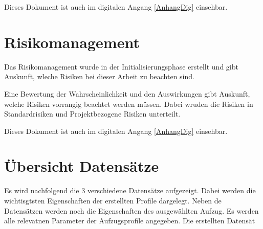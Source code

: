 Dieses Dokument ist auch im digitalen Angang \ref{AnhangDig} einsehbar.


%

%



\chapter{Risikomanagement}
\label{AnhangC}
\setcounter{page}{9}
Das Risikomanagement wurde in der Initialisierungsphase erstellt und gibt Auskunft, wleche Risiken bei dieser Arbeit zu beachten sind.

Eine Bewertung der Wahrscheinlichkeit und den Auswirkungen gibt Auskunft, welche Risiken vorrangig beachtet werden müssen.  Dabei wruden die Risiken in Standardrisiken und Projektbezogene Risiken unterteilt.

Dieses Dokument ist auch im digitalen Angang \ref{AnhangDig} einsehbar.


\chapter{Übersicht Datensätze }
\label{AnhangD}

Es wird nachfolgend die 3 verschiedene Datensätze aufgezeigt. Dabei werden die wichtisgtsten Eigenschaften der erstellten Profile dargelegt. Neben de Datensätzen werden noch die Eigenschaften des ausgewählten Aufzug. Es werden alle relevatnen Parameter der Aufzugsprofile angegeben. Die erstellten Datensät
